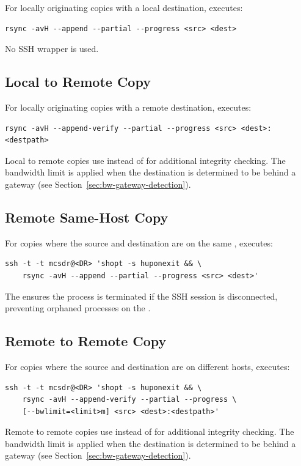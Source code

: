 For locally originating copies with a local destination, \SC{} executes:
\begin{lstlisting}
rsync -avH --append --partial --progress <src> <dest>
\end{lstlisting}

No SSH wrapper is used.

\subsection{Local to Remote Copy}

For locally originating copies with a remote destination, \SC{} executes:
\begin{lstlisting}
rsync -avH --append-verify --partial --progress <src> <dest>:<destpath>
\end{lstlisting}

Local to remote copies use  instead of  for additional integrity checking. The bandwidth limit is applied when the destination is determined to be behind a gateway (see Section~\ref{sec:bw-gateway-detection}).

\subsection{Remote Same-Host Copy}

For copies where the source and destination are on the same \DR{}, \SC{} executes:
\begin{lstlisting}
ssh -t -t mcsdr@<DR> 'shopt -s huponexit && \
    rsync -avH --append --partial --progress <src> <dest>'
\end{lstlisting}

The  ensures the  process is terminated if the SSH session is disconnected, preventing orphaned processes on the \DR{}.

\subsection{Remote to Remote Copy}

For copies where the source and destination are on different hosts, \SC{} executes:
\begin{lstlisting}
ssh -t -t mcsdr@<DR> 'shopt -s huponexit && \
    rsync -avH --append-verify --partial --progress \
    [--bwlimit=<limit>m] <src> <dest>:<destpath>'
\end{lstlisting}

Remote to remote copies use \code{--append-verify} instead of  for additional integrity checking. The bandwidth limit is applied when the destination is determined to be behind a gateway (see Section~\ref{sec:bw-gateway-detection}).

